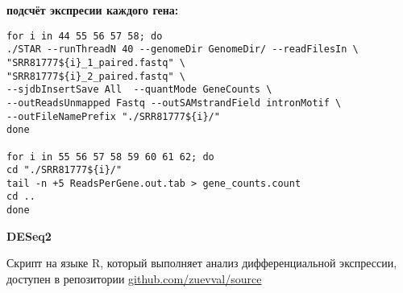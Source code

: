 \textbf{подсчёт экспресии каждого гена:}

\begin{verbatim}
for i in 44 55 56 57 58; do
./STAR --runThreadN 40 --genomeDir GenomeDir/ --readFilesIn \
"SRR81777${i}_1_paired.fastq" \
"SRR81777${i}_2_paired.fastq" \
--sjdbInsertSave All  --quantMode GeneCounts \
--outReadsUnmapped Fastq --outSAMstrandField intronMotif \
--outFileNamePrefix "./SRR81777${i}/"
done

for i in 55 56 57 58 59 60 61 62; do
cd "./SRR81777${i}/"
tail -n +5 ReadsPerGene.out.tab > gene_counts.count
cd ..
done
\end{verbatim}

\textbf{DESeq2}

Скрипт на языке R, который выполняет анализ дифференциальной экспрессии, доступен в репозитории \href{https://github.com/zuevval/source/blob/d3726da4f9079602953aede111d3b292f257c057/r/bioinf2022_spring_project/de_analysis.R}{github.com/zuevval/source}

%
%
%
%
%
%
%
%
%

